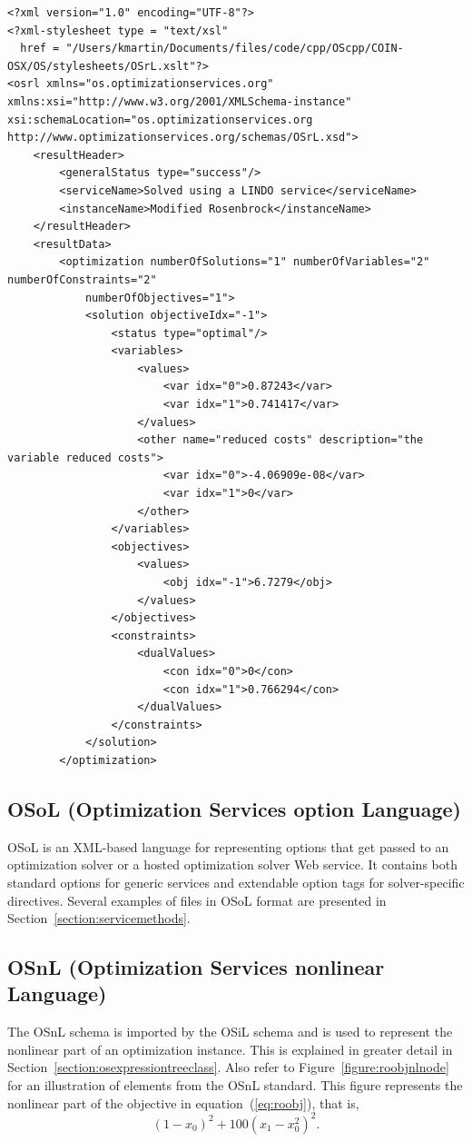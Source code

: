 \documentclass[11pt]{article}
\newcounter{Fig}
\renewcommand{\_}{{\char"5F}}
\renewcommand{\{}{{\char"7B}}
\renewcommand{\}}{{\char"7D}}
\renewcommand{\^}{{\char"0D}}
\renewcommand{\'}{{\char"0D}}
\begin{document}
\begin{enumerate}[Step 1:]
{\small
\begin{verbatim}
<?xml version="1.0" encoding="UTF-8"?>
<?xml-stylesheet type = "text/xsl"
  href = "/Users/kmartin/Documents/files/code/cpp/OScpp/COIN-OSX/OS/stylesheets/OSrL.xslt"?>
<osrl xmlns="os.optimizationservices.org"
xmlns:xsi="http://www.w3.org/2001/XMLSchema-instance"
xsi:schemaLocation="os.optimizationservices.org
http://www.optimizationservices.org/schemas/OSrL.xsd">
    <resultHeader>
        <generalStatus type="success"/>
        <serviceName>Solved using a LINDO service</serviceName>
        <instanceName>Modified Rosenbrock</instanceName>
    </resultHeader>
    <resultData>
        <optimization numberOfSolutions="1" numberOfVariables="2" numberOfConstraints="2"
            numberOfObjectives="1">
            <solution objectiveIdx="-1">
                <status type="optimal"/>
                <variables>
                    <values>
                        <var idx="0">0.87243</var>
                        <var idx="1">0.741417</var>
                    </values>
                    <other name="reduced costs" description="the variable reduced costs">
                        <var idx="0">-4.06909e-08</var>
                        <var idx="1">0</var>
                    </other>
                </variables>
                <objectives>
                    <values>
                        <obj idx="-1">6.7279</obj>
                    </values>
                </objectives>
                <constraints>
                    <dualValues>
                        <con idx="0">0</con>
                        <con idx="1">0.766294</con>
                    </dualValues>
                </constraints>
            </solution>
        </optimization>
\end{verbatim}
}



\subsection{OSoL (Optimization Services option Language)} \label{section:osolschema}
OSoL is
an XML-based language for representing options that get passed to an optimization solver or a hosted optimization 
solver Web service. It contains both standard options for generic services and extendable option tags for 
solver-specific directives. 
Several examples of files in OSoL format are presented in Section~\ref{section:servicemethods}.%

\subsection{OSnL (Optimization Services nonlinear Language)} \label{section:osnlschema}
The OSnL schema is imported by the OSiL schema and is used to represent the nonlinear part of an optimization 
instance. This is explained in greater detail in Section~\ref{section:osexpressiontreeclass}. Also refer to 
Figure~\ref{figure:roobjnlnode} for an illustration of elements from the OSnL standard. This figure represents
the nonlinear part of the objective in equation~(\ref{eq:roobj}), that is, 
%
$$
(1-x_0)^2 + 100 (x_1-x_0^2)^2.
$$


\end{enumerate}
\end{document}
